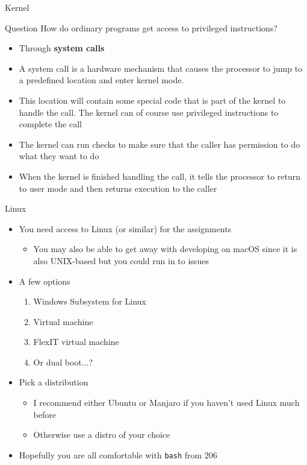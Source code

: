 \documentclass[notes]{beamer}
\begin{document}
\begin{frame}{Kernel}
\begin{alertblock}{Question}
    How do ordinary programs get access to privileged instructions?
\end{alertblock}
\begin{itemize}
    \pause
    \item Through \textbf{system calls}
    \pause
    \item A system call is a hardware mechanism that causes the processor to jump to a predefined location and enter kernel mode.
    \item This location will contain some special code that is part of the kernel to handle the call. The kernel can of course use privileged instructions to complete the call
    \item The kernel can run checks to make sure that the caller has permission to do what they want to do
    \item When the kernel is finished handling the call, it tells the processor to return to user mode and then returns execution to the caller
\end{itemize}
\end{frame}
\begin{frame}{Linux}
    \begin{itemize}
        \item You need access to Linux (or similar) for the assignments
        \begin{itemize}
            \item You may also be able to get away with developing on macOS since it is also UNIX-based but you could run in to issues
        \end{itemize}
        \item A few options
        \begin{enumerate}
            \item Windows Subsystem for Linux
            \item Virtual machine
            \item FlexIT virtual machine
            \item Or dual boot...?
        \end{enumerate}
        \item Pick a distribution
        \begin{itemize}
            \item I recommend either Ubuntu or Manjaro if you haven't used Linux much before
            \item Otherwise use a distro of your choice
        \end{itemize}
        \item Hopefully you are all comfortable with \texttt{bash} from 206
    \end{itemize}
\end{frame}
\end{document}
